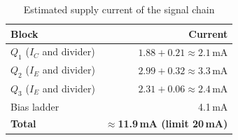\documentclass[12pt,a4paper]{article}
\begin{document}
	\begin{table}[H]
		\centering
		\caption{Estimated supply current of the signal chain}
		\label{tab:budget}
		\renewcommand{\arraystretch}{1.25}
		\begin{tabular}{|l|r|}
			\hline
			\rowcolor{black!12}\textbf{Block} & \textbf{Current} \\
			\hline
			$Q_1$ ($I_C$ and divider) & $1.88+0.21\approx2.1$\,mA \\
			\hline
			$Q_2$ ($I_E$ and divider) & $2.99+0.32\approx3.3$\,mA \\
			\hline
			$Q_3$ ($I_E$ and divider) & $2.31+0.06\approx2.4$\,mA \\
			\hline
			Bias ladder & 4.1\,mA \\
			\hline
			\textbf{Total} & \textbf{$\approx$11.9\,mA (limit 20\,mA)} \\
			\hline
		\end{tabular}
	\end{table}

\end{document}
